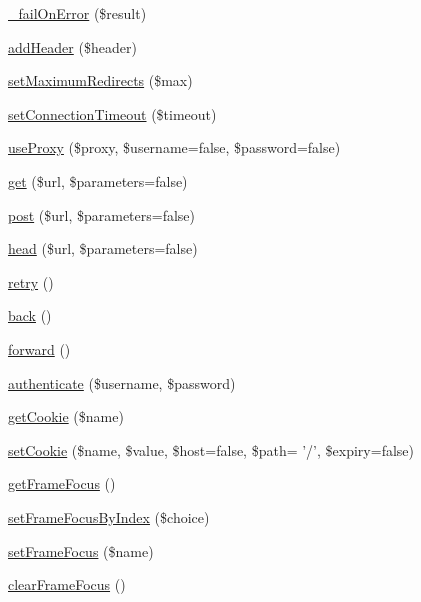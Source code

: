 \begin{DoxyCompactItemize}
\item 
\hyperlink{class_web_test_case_aa1a77c000c079da166026abda36dffc5}{\_\-failOnError} (\$result)
\item 
\hyperlink{class_web_test_case_a8580ffac71f2d312784b87faa9452bdc}{addHeader} (\$header)
\item 
\hyperlink{class_web_test_case_a1a94a628582b9cdb0610ee5772c0c5b9}{setMaximumRedirects} (\$max)
\item 
\hyperlink{class_web_test_case_a8e7e4de35b6b6e4f8a3139709f975193}{setConnectionTimeout} (\$timeout)
\item 
\hyperlink{class_web_test_case_aa05541e229c6ef1b31a51028cf08c92d}{useProxy} (\$proxy, \$username=false, \$password=false)
\item 
\hyperlink{class_web_test_case_a754f1efbaf6d5fb23208f2e823d37887}{get} (\$url, \$parameters=false)
\item 
\hyperlink{class_web_test_case_a7d409a4e22876ab2b96ee330c0bedc8c}{post} (\$url, \$parameters=false)
\item 
\hyperlink{class_web_test_case_af774376bbbcf017378dbec675015a760}{head} (\$url, \$parameters=false)
\item 
\hyperlink{class_web_test_case_ae8327032083ec6211ad823c45cb72084}{retry} ()
\item 
\hyperlink{class_web_test_case_a76f85e79d4ff8679a869af826186c6e9}{back} ()
\item 
\hyperlink{class_web_test_case_a3bcb61ac6efd4894ca22a702859191df}{forward} ()
\item 
\hyperlink{class_web_test_case_a09a9ef390ae02778cfab67678d72db62}{authenticate} (\$username, \$password)
\item 
\hyperlink{class_web_test_case_a104b5a93fe99f66cef9c170066e4c19e}{getCookie} (\$name)
\item 
\hyperlink{class_web_test_case_ab874157186e2bc2c9d5610f007618ed9}{setCookie} (\$name, \$value, \$host=false, \$path= '/', \$expiry=false)
\item 
\hyperlink{class_web_test_case_ab099bbb517810122d6a94889dc8541ad}{getFrameFocus} ()
\item 
\hyperlink{class_web_test_case_afbcb7ba0d00c5df36698d2669d90cd9c}{setFrameFocusByIndex} (\$choice)
\item 
\hyperlink{class_web_test_case_a82a0b459aa100c3a67eec773c6e5b39d}{setFrameFocus} (\$name)
\item 
\hyperlink{class_web_test_case_ae38524c59375b3e28ad37b35be923b1d}{clearFrameFocus} ()
\item 

\end{DoxyCompactItemize}
